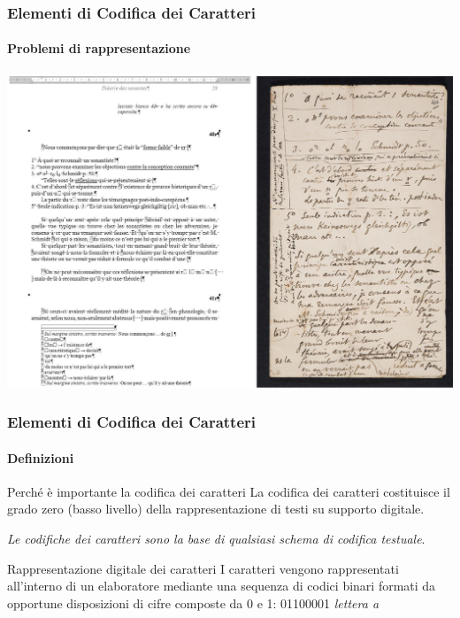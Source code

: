 \begin{frame}
	\frametitle{Elementi di Codifica dei Caratteri}
	\framesubtitle{Problemi di rappresentazione}
	\addtocounter{nframe}{1}

	\begin{center}
		\includegraphics[width=.9\textwidth]{imgs/SaussureTrascrizione.pdf}
	\end{center}

\end{frame}


\begin{frame}
	\frametitle{Elementi di Codifica dei Caratteri}
	\framesubtitle{Definizioni}
	\addtocounter{nframe}{1}

	\begin{block}{Perché è importante la codifica dei caratteri}
		La codifica dei caratteri costituisce il grado zero (basso livello) della rappresentazione di testi su supporto digitale.
		\begin{center}
			\textit{Le codifiche dei caratteri sono la base di qualsiasi schema di codifica testuale}.
		\end{center}
	\end{block}

	\begin{block}{Rappresentazione digitale dei caratteri}
		I caratteri vengono rappresentati all’interno di un elaboratore mediante una sequenza di codici binari formati da opportune disposizioni di cifre composte da 0 e 1: 01100001 \textit{lettera a}
	\end{block}

\end{frame}



